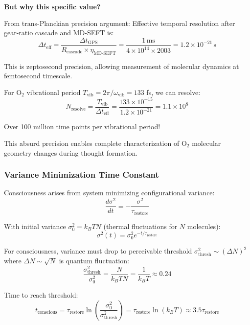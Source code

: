 \documentclass[11pt,onecolumn]{article}
\begin{document}
\textbf{But why this specific value?}

From trans-Planckian precision argument: Effective temporal resolution after gear-ratio cascade and MD-SEFT is:
\begin{equation}
\Delta t_{\text{eff}} = \frac{\Delta t_{\text{GPS}}}{R_{\text{cascade}} \times \eta_{\text{MD-SEFT}}} = \frac{1\,\text{ms}}{4 \times 10^{14} \times 2003} = 1.2 \times 10^{-21}\,\text{s}
\end{equation}

This is zeptosecond precision, allowing measurement of molecular dynamics at femtosecond timescale.

For O$_2$ vibrational period $T_{\text{vib}} = 2\pi/\omega_{\text{vib}} = 133$ fs, we can resolve:
\begin{equation}
N_{\text{resolve}} = \frac{T_{\text{vib}}}{\Delta t_{\text{eff}}} = \frac{133 \times 10^{-15}}{1.2 \times 10^{-21}} = 1.1 \times 10^8
\end{equation}

Over 100 million time points per vibrational period!

This absurd precision enables complete characterization of O$_2$ molecular geometry changes during thought formation.

\subsubsection{Variance Minimization Time Constant}

Consciousness arises from system minimizing configurational variance:
\begin{equation}
\frac{d\sigma^2}{dt} = -\frac{\sigma^2}{\tau_{\text{restore}}}
\end{equation}

With initial variance $\sigma_0^2 = k_B T N$ (thermal fluctuations for $N$ molecules):
\begin{equation}
\sigma^2(t) = \sigma_0^2 e^{-t/\tau_{\text{restore}}}
\end{equation}

For consciousness, variance must drop to perceivable threshold $\sigma_{\text{thresh}}^2 \sim (\Delta N)^2$ where $\Delta N \sim \sqrt{N}$ is quantum fluctuation:
\begin{equation}
\frac{\sigma_{\text{thresh}}^2}{\sigma_0^2} = \frac{N}{k_B T N} = \frac{1}{k_B T} \approx 0.24
\end{equation}

Time to reach threshold:
\begin{equation}
t_{\text{conscious}} = \tau_{\text{restore}} \ln\left(\frac{\sigma_0^2}{\sigma_{\text{thresh}}^2}\right) = \tau_{\text{restore}} \ln(k_B T) \approx 3.5 \tau_{\text{restore}}
\end{equation}
\end{document}
